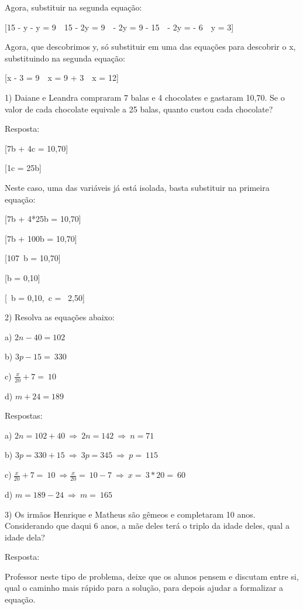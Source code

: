 Agora, substituir na segunda equação:

[15 - y - y = 9\  \Rightarrow \ 15 - 2y = 9\  \Rightarrow \  - 2y = 9 - 15\  \Rightarrow \  - 2y = - 6\  \Rightarrow \ y = 3]

Agora, que descobrimos y, só substituir em uma das equações para
descobrir o x, substituindo na segunda equação:

[x - 3 = 9\  \Rightarrow \ x = 9 + 3\  \Rightarrow \ x = 12]


1) Daiane e Leandra compraram 7 balas e 4 chocolates e gastaram 10,70.
Se o valor de cada chocolate equivale a 25 balas, quanto custou cada
chocolate?

Resposta:

[7b + 4c = 10,70]

[1c = 25b]

Neste caso, uma das variáveis já está isolada, basta substituir na
primeira equação:

[7b + 4*25b = 10,70]

[7b + 100b = 10,70]

[107\ b = 10,70]

[b = 0,10]

[\ b = 0,10,\ c = \ 2,50]

2) Resolva as equações abaixo:

a) \(2n - 40 = 102\)

b) \(3p - 15 = \ 330\)

c) \(\frac{x}{20} + 7 = \ 10\)

d) \(m + 24 = 189\)

Respostas:

a) \(2n = 102 + 40\  \Rightarrow \ 2n = 142\  \Rightarrow \ n = 71\)

b) \(3p = 330 + 15\  \Rightarrow \ 3p = 345\  \Rightarrow \ p = \ 115\)

c)\(\ \frac{x}{20} + 7 = \ 10\  \Rightarrow \frac{x}{20} = \ 10 - 7\  \Rightarrow \ x = \ 3*20 = \ 60\)

d) \(m = 189 - 24\  \Rightarrow \ m = \ 165\)

3) Os irmãos Henrique e Matheus são gêmeos e completaram 10 anos.
Considerando que daqui 6 anos, a mãe deles terá o triplo da idade deles,
qual a idade dela?

Resposta:

Professor neste tipo de problema, deixe que os alunos pensem e discutam
entre si, qual o caminho mais rápido para a solução, para depois ajudar
a formalizar a equação.

